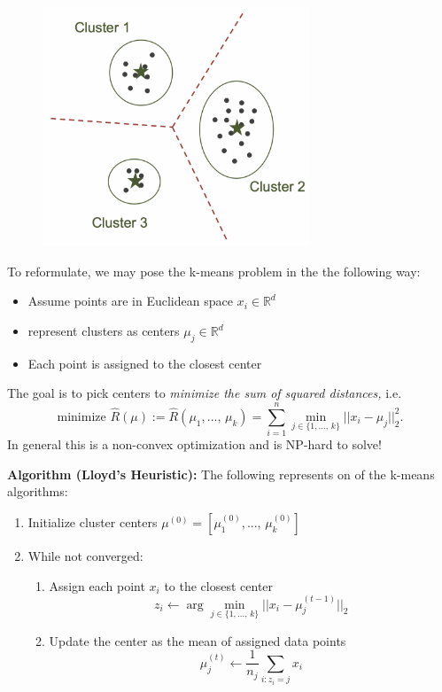 \documentclass[a4paper]{extarticle}
\begin{document}
\begin{figure}[H]
    \includegraphics[width=8cm]{../images/IntroML_Fig8-4}
    \centering
\end{figure}

To reformulate, we may pose the k-means problem in the the following way:
\begin{itemize}
    \item Assume points are in Euclidean space $x_i \in \mathbb{R}^d$
    \item represent clusters as centers $\mu_j \in \mathbb{R}^d$
    \item Each point is assigned to the closest center
\end{itemize}
The goal is to pick centers to \textit{minimize the sum of squared distances,} i.e.
\[
    \text{minimize } \hat{R}(\mu) := \hat{R}(\mu_1,..., \, \mu_k) = \sum_{i = 1}^n \min_{j \in \{1,..., \, k\}} ||x_i - \mu_j||_2^2.
\]
In general this is a non-convex optimization and is NP-hard to solve!

\begin{cbox}
    \textbf{Algorithm (Lloyd's Heuristic):} The following represents on of the k-means algorithms:
    \begin{enumerate}
        \item Initialize cluster centers $\mu^{(0)} = [\mu^{(0)}_1,..., \, \mu^{(0)}_k]$
        \item While not converged:
        \begin{enumerate}
            \item Assign each point $x_i$ to the closest center
            \[
                z_i \leftarrow \arg \min_{j \in \{1,..., \, k\}} ||x_i - \mu^{(t-1)}_j||_2
            \]
            \item Update the center as the mean of assigned data points
            \[
                \mu^{(t)}_j \leftarrow \frac{1}{n_j} \sum_{i : z_i = j} x_i
            \]
        \end{enumerate}
    \end{enumerate}
\end{cbox}
\end{document}
